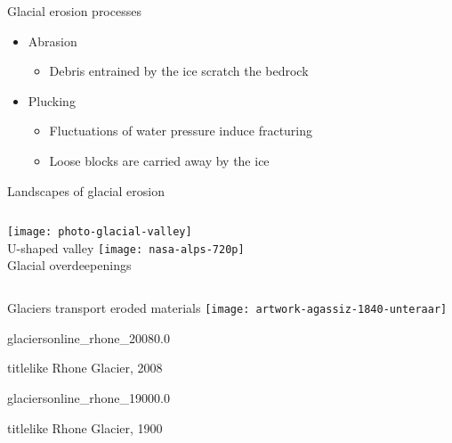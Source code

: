     \begin{frame}{Glacial erosion processes}
      \begin{itemize}
        \item Abrasion
          \begin{itemize}
            \item Debris entrained by the ice scratch the bedrock
          \end{itemize}
        \bigskip
        \item Plucking
          \begin{itemize}
            \item Fluctuations of water pressure induce fracturing
            \item Loose blocks are carried away by the ice
          \end{itemize}
      \end{itemize}
    \end{frame}

    \begin{frame}{Landscapes of glacial erosion}
      \begin{columns}
        \column{60mm}
          \texttt{[image: photo-glacial-valley]}\\
          U-shaped valley
        \column{60mm}
          \texttt{[image: nasa-alps-720p]}\\
          Glacial overdeepenings
      \end{columns}
    \end{frame}


    \begin{frame}{Glaciers transport eroded materials}
      \texttt{[image: artwork-agassiz-1840-unteraar]}
    \end{frame}

    \begin{backgroundframe}[b]{glaciersonline_rhone_2008}{0.0}{}
      \begin{beamercolorbox}[sep=1em,wd=45mm]{titlelike}
        Rhone Glacier, 2008
      \end{beamercolorbox}
    \end{backgroundframe}

    \begin{backgroundframe}[b]{glaciersonline_rhone_1900}{0.0}{}
      \begin{beamercolorbox}[sep=1em,wd=45mm]{titlelike}
        Rhone Glacier, 1900
      \end{beamercolorbox}
    \end{backgroundframe}

